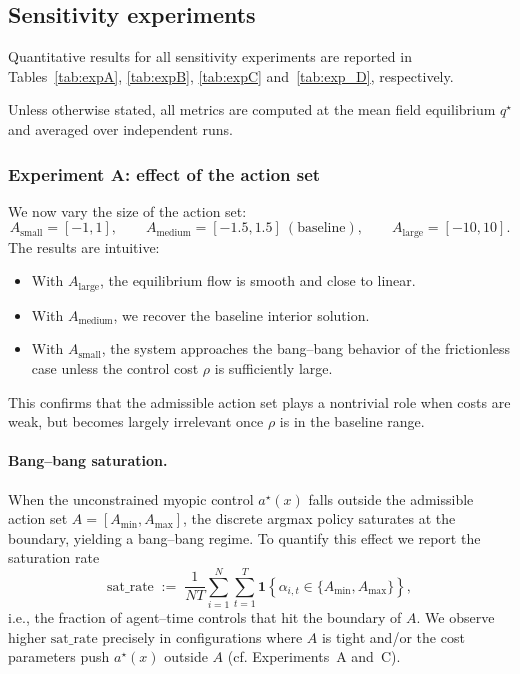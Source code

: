 \documentclass[11pt]{article}
\theoremstyle{definition}
\begin{document}
\subsection*{Sensitivity experiments}
Quantitative results for all sensitivity experiments are reported in
Tables~\ref{tab:expA}, \ref{tab:expB}, \ref{tab:expC} and~\ref{tab:exp_D}, respectively.

Unless otherwise stated, all metrics are computed at the mean field equilibrium $q^\star$
and averaged over independent runs.
\subsubsection*{Experiment A: effect of the action set}

We now vary the size of the action set:
\[
A_{\text{small}} = [-1,1],\qquad
A_{\text{medium}} = [-1.5,1.5]\ (\text{baseline}),\qquad
A_{\text{large}} = [-10,10].
\]
The results are intuitive:
\begin{itemize}
    \item With $A_{\text{large}}$, the equilibrium flow is smooth and close to linear.
    \item With $A_{\text{medium}}$, we recover the baseline interior solution.
    \item With $A_{\text{small}}$, the system approaches the bang--bang behavior of the frictionless case unless the control cost $\rho$ is sufficiently large.
\end{itemize}

This confirms that the admissible action set plays a nontrivial role when costs 
are weak, but becomes largely irrelevant once $\rho$ is in the baseline range.


\paragraph{Bang--bang saturation.}
When the unconstrained myopic control $a^\star(x)$ falls outside the admissible action set $A=[A_{\min},A_{\max}]$, the discrete argmax policy saturates at the boundary, yielding a bang--bang regime.
To quantify this effect we report the saturation rate
\begin{equation}
\mathrm{sat\_rate}
\;:=\;
\frac{1}{NT}\sum_{i=1}^N\sum_{t=1}^T
\mathbf{1}\!\left\{\alpha_{i,t}\in\{A_{\min},A_{\max}\}\right\},
\label{eq:sat_rate}
\end{equation}
i.e., the fraction of agent--time controls that hit the boundary of $A$.
We observe higher $\mathrm{sat\_rate}$ precisely in configurations where $A$ is tight and/or the cost parameters push $a^\star(x)$ outside $A$ (cf. Experiments~A and~C).
\end{document}
